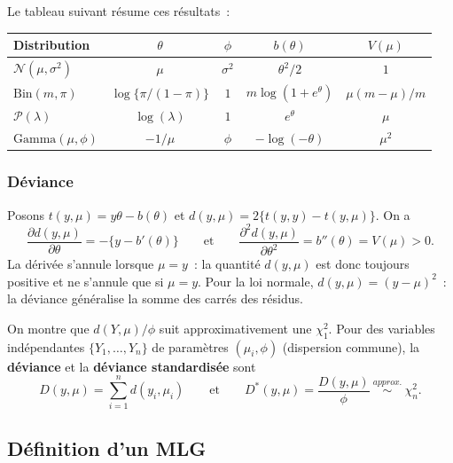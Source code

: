 \documentclass[11pt,letterpaper]{article}
\begin{document}
Le tableau suivant résume ces résultats~:
\begin{center}
\begin{tabular}{lcccc}
\toprule
Distribution & $\theta$ & $\phi$ & $b(\theta)$ & $V(\mu)$ \\
\midrule
$\mathcal{N}(\mu,\sigma^2)$ & $\mu$ & $\sigma^2$ & $\theta^2/2$ & $1$ \\
$\mathrm{Bin}(m,\pi)$ & $\log\{\pi/(1-\pi)\}$ & $1$ & $m\log(1+e^\theta)$ & $\mu(m-\mu)/m$ \\
$\mathcal{P}(\lambda)$ & $\log(\lambda)$ & $1$ & $e^\theta$ & $\mu$ \\
$\mathrm{Gamma}(\mu,\phi)$ & $-1/\mu$ & $\phi$ & $-\log(-\theta)$ & $\mu^2$ \\
\bottomrule
\end{tabular}
\end{center}

\subsubsection{Déviance}

Posons $t(y,\mu) = y\theta - b(\theta)$ et $d(y,\mu) = 2\{t(y,y) - t(y,\mu)\}$. On a
$$\frac{\partial d(y,\mu)}{\partial\theta} = -\{y - b'(\theta)\} \qquad \mbox{et} \qquad \frac{\partial^2 d(y,\mu)}{\partial\theta^2} = b''(\theta) = V(\mu) > 0.$$
La dérivée s'annule lorsque $\mu = y$~: la quantité $d(y,\mu)$ est donc toujours positive et ne s'annule que si $\mu = y$. Pour la loi normale, $d(y,\mu) = (y-\mu)^2$~: la déviance généralise la somme des carrés des résidus.

On montre que $d(Y,\mu)/\phi$ suit approximativement une $\chi^2_1$. Pour des variables indépendantes $\{Y_1,\ldots,Y_n\}$ de paramètres $(\mu_i,\phi)$ (dispersion commune), la \textbf{déviance} et la \textbf{déviance standardisée} sont
$$D(y,\mu) = \sum_{i=1}^n d(y_i,\mu_i) \qquad\mbox{et}\qquad D^*(y,\mu) = \frac{D(y,\mu)}{\phi} \ \stackrel{approx.}{\sim}\ \chi^2_n.$$

\subsection{Définition d'un MLG}
\end{document}
